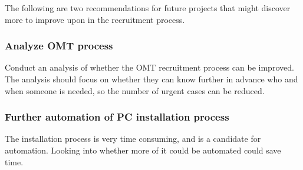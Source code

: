 The following are two recommendations for future projects that might discover more to improve upon in the recruitment process.

\subsubsection{Analyze OMT process}
Conduct an analysis of whether the OMT recruitment process can be improved.
The analysis should focus on whether they can know further in advance who and when someone is needed, so the number of urgent cases can be reduced.

\subsubsection{Further automation of PC installation process}
The installation process is very time consuming, and is a candidate for automation.
Looking into whether more of it could be automated could save time.
